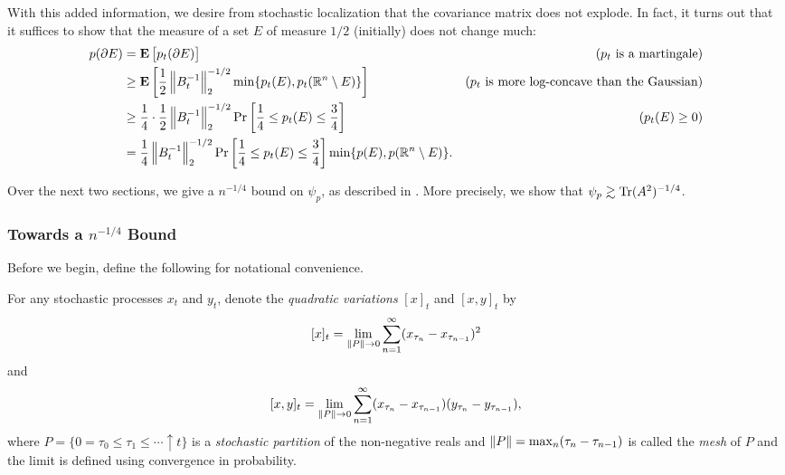 		With this added information, we desire from stochastic localization that the covariance matrix does not explode. %
		In fact, it turns out that it suffices to show that the measure of a set $E$ of measure $1/2$ (initially) does not change much:
		\begin{align}
			p(\partial E) &= \textbf{E}\left[p_t(\partial E)\right] & (p_t\text{ is a martingale}) \nonumber \\
				&\geq \textbf{E}\left[\frac{1}{2}\left\lVert B_t^{-1}\right\rVert_2^{-1/2}\min\{p_t(E),p_t(\mathbb{R}^n\setminus E)\}\right] & (p_t \text{ is more log-concave than the Gaussian}) \nonumber \\
				&\geq \frac{1}{4}\cdot\frac{1}{2}\left\lVert B_t^{-1}\right\rVert_2^{-1/2}\Pr\left[\frac{1}{4} \leq p_t(E) \leq \frac{3}{4}\right] & (p_t(E) \geq 0) \nonumber \\
				&= \frac{1}{4}\left\lVert B_t^{-1}\right\rVert_2^{-1/2}\Pr\left[\frac{1}{4} \leq p_t(E) \leq \frac{3}{4}\right]\min\{p(E),p(\mathbb{R}^n\setminus E)\}. \label{stoch loc: basic intuition}
		\end{align}

		Over the next two sections, we give a $n^{-1/4}$ bound on $\psi_p$, as described in \cite{lee-vempala-kls-n14}. More precisely, we show that $\psi_p \gtrsim \operatorname{Tr}(A^2)^{-1/4}$.

	\subsubsection{Towards a \texorpdfstring{$n^{-1/4}$}{n1/4} Bound}

		Before we begin, define the following for notational convenience.
		\begin{definition}
			For any stochastic processes $x_t$ and $y_t$, denote the \textit{quadratic variations} $[x]_t$ and $[x,y]_t$ by
			\[ [x]_t = \lim_{\left\lVert P\right\rVert \to 0} \sum_{n=1}^\infty (x_{\tau_n} - x_{\tau_{n-1}})^2 \]
			and
			\[ [x,y]_t = \lim_{\left\lVert P\right\rVert \to 0} \sum_{n=1}^\infty (x_{\tau_n} - x_{\tau_{n-1}})(y_{\tau_n} - y_{\tau_{n-1}}), \]
			where $P = \{ 0 = \tau_0 \leq \tau_1 \leq \cdots \uparrow t \}$ is a \textit{stochastic partition} of the non-negative reals and $\left\lVert P\right\rVert = \max_n (\tau_n - \tau_{n-1})$ is called the \textit{mesh} of $P$ and the limit is defined using convergence in probability.
		\end{definition}

